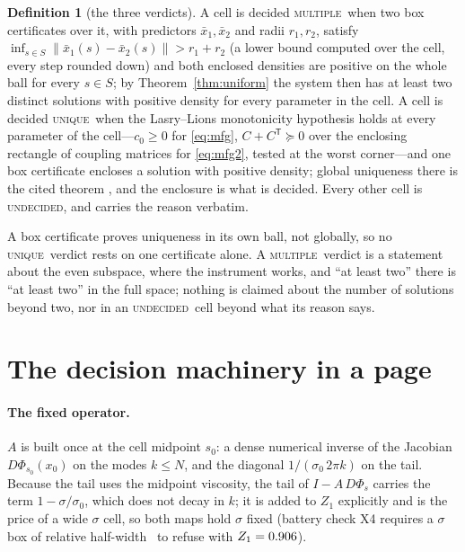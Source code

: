 \documentclass[11pt]{article}
\theoremstyle{definition}
\newtheorem{definition}{Definition}
\newcommand{\MULT}{\textup{\textsc{multiple}}}
\newcommand{\UNIQ}{\textup{\textsc{unique}}}
\newcommand{\UNDEC}{\textup{\textsc{undecided}}}
\begin{document}
\begin{definition}[the three verdicts]\label{def:verdict}
A cell is decided \MULT\ when two box certificates over it, with predictors $\bar x_1,\bar x_2$ and radii $r_1,r_2$, satisfy $\inf_{s\in S}\|\bar x_1(s)-\bar x_2(s)\|>r_1+r_2$ (a lower bound computed over the cell, every step rounded down) and both enclosed densities are positive on the whole ball for every $s\in S$; by Theorem~\ref{thm:uniform} the system then has at least two distinct solutions with positive density for every parameter in the cell. A cell is decided \UNIQ\ when the Lasry--Lions monotonicity hypothesis holds at every parameter of the cell---$c_0\ge0$ for \eqref{eq:mfg}, $C+C^{\mathsf T}\succeq0$ over the enclosing rectangle of coupling matrices for \eqref{eq:mfg2}, tested at the worst corner---and one box certificate encloses a solution with positive density; global uniqueness there is the cited theorem \cite{LL07}, and the enclosure is what is decided. Every other cell is \UNDEC, and carries the reason verbatim.
\end{definition}

\begin{remark}
A box certificate proves uniqueness in its own ball, not globally, so no \UNIQ\ verdict rests on one certificate alone. A \MULT\ verdict is a statement about the even subspace, where the instrument works, and ``at least two'' there is ``at least two'' in the full space; nothing is claimed about the number of solutions beyond two, nor in an \UNDEC\ cell beyond what its reason says.
\end{remark}

\section{The decision machinery in a page}\label{sec:machinery}

\paragraph{The fixed operator.} $A$ is built once at the cell midpoint $s_0$: a dense numerical inverse of the Jacobian $D\Phi_{s_0}(x_0)$ on the modes $k\le N$, and the diagonal $1/(\sigma_0\,2\pi k)$ on the tail. Because the tail uses the midpoint viscosity, the tail of $I-A\,D\Phi_s$ carries the term $1-\sigma/\sigma_0$, which does not decay in $k$; it is added to $Z_1$ explicitly and is the price of a wide $\sigma$ cell, so both maps hold $\sigma$ fixed (battery check X4 requires a $\sigma$ box of relative half-width \BatOneXfourHalf\ to refuse with $Z_1=0.906$).
\end{document}
